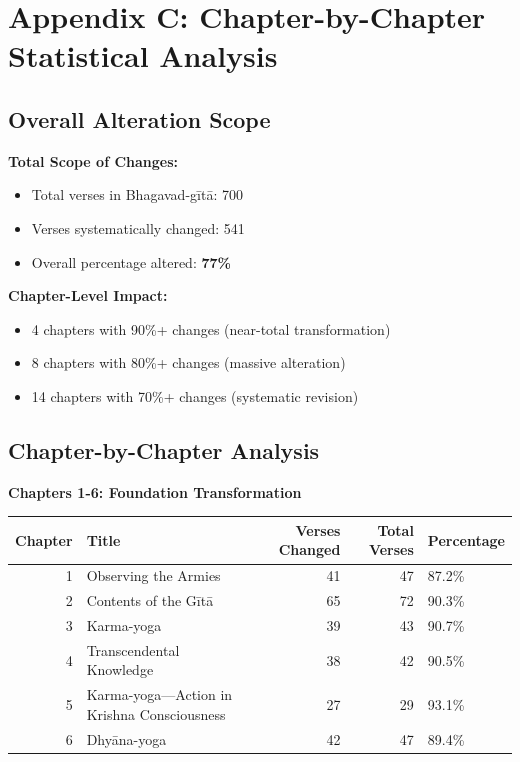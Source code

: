 \documentclass[11pt,twoside]{book}
\begin{document}
\chapter*{Appendix C: Chapter-by-Chapter Statistical Analysis}
\label{sec:orgb5793df}

\section*{Overall Alteration Scope}
\label{sec:orgc9ace5c}

\textbf{\textbf{Total Scope of Changes:}}
\begin{itemize}
\item Total verses in Bhagavad-gītā: 700
\item Verses systematically changed: 541
\item Overall percentage altered: \textbf{\textbf{77\%}}
\end{itemize}

\textbf{\textbf{Chapter-Level Impact:}}
\begin{itemize}
\item 4 chapters with 90\%+ changes (near-total transformation)
\item 8 chapters with 80\%+ changes (massive alteration)
\item 14 chapters with 70\%+ changes (systematic revision)
\end{itemize}
\section*{Chapter-by-Chapter Analysis}
\label{sec:org2c290a8}

\textbf{\textbf{Chapters 1-6: Foundation Transformation}}

\begin{center}
\begin{tabular}{rlrrl}
Chapter & Title & Verses Changed & Total Verses & Percentage\\
\hline
1 & Observing the Armies & 41 & 47 & 87.2\%\\
2 & Contents of the Gītā & 65 & 72 & 90.3\%\\
3 & Karma-yoga & 39 & 43 & 90.7\%\\
4 & Transcendental Knowledge & 38 & 42 & 90.5\%\\
5 & Karma-yoga—Action in Krishna Consciousness & 27 & 29 & 93.1\%\\
6 & Dhyāna-yoga & 42 & 47 & 89.4\%\\
\end{tabular}
\end{center}
\end{document}
